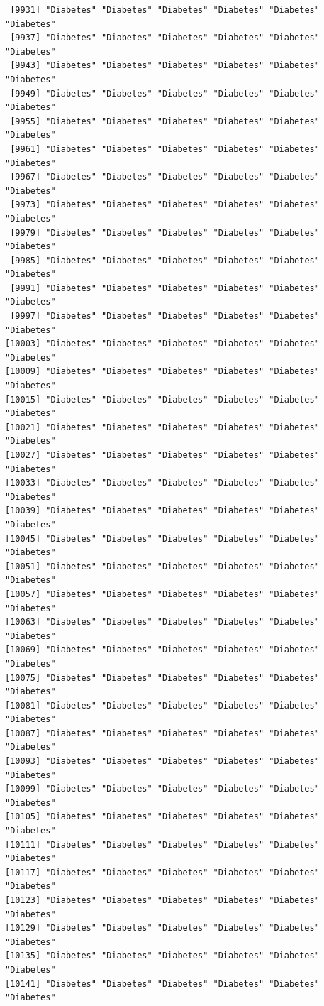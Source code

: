 \documentclass[
  letterpaper,
  DIV=11,
  numbers=noendperiod]{scrartcl}
\begin{document}
\begin{verbatim}
 [9931] "Diabetes" "Diabetes" "Diabetes" "Diabetes" "Diabetes" "Diabetes"
 [9937] "Diabetes" "Diabetes" "Diabetes" "Diabetes" "Diabetes" "Diabetes"
 [9943] "Diabetes" "Diabetes" "Diabetes" "Diabetes" "Diabetes" "Diabetes"
 [9949] "Diabetes" "Diabetes" "Diabetes" "Diabetes" "Diabetes" "Diabetes"
 [9955] "Diabetes" "Diabetes" "Diabetes" "Diabetes" "Diabetes" "Diabetes"
 [9961] "Diabetes" "Diabetes" "Diabetes" "Diabetes" "Diabetes" "Diabetes"
 [9967] "Diabetes" "Diabetes" "Diabetes" "Diabetes" "Diabetes" "Diabetes"
 [9973] "Diabetes" "Diabetes" "Diabetes" "Diabetes" "Diabetes" "Diabetes"
 [9979] "Diabetes" "Diabetes" "Diabetes" "Diabetes" "Diabetes" "Diabetes"
 [9985] "Diabetes" "Diabetes" "Diabetes" "Diabetes" "Diabetes" "Diabetes"
 [9991] "Diabetes" "Diabetes" "Diabetes" "Diabetes" "Diabetes" "Diabetes"
 [9997] "Diabetes" "Diabetes" "Diabetes" "Diabetes" "Diabetes" "Diabetes"
[10003] "Diabetes" "Diabetes" "Diabetes" "Diabetes" "Diabetes" "Diabetes"
[10009] "Diabetes" "Diabetes" "Diabetes" "Diabetes" "Diabetes" "Diabetes"
[10015] "Diabetes" "Diabetes" "Diabetes" "Diabetes" "Diabetes" "Diabetes"
[10021] "Diabetes" "Diabetes" "Diabetes" "Diabetes" "Diabetes" "Diabetes"
[10027] "Diabetes" "Diabetes" "Diabetes" "Diabetes" "Diabetes" "Diabetes"
[10033] "Diabetes" "Diabetes" "Diabetes" "Diabetes" "Diabetes" "Diabetes"
[10039] "Diabetes" "Diabetes" "Diabetes" "Diabetes" "Diabetes" "Diabetes"
[10045] "Diabetes" "Diabetes" "Diabetes" "Diabetes" "Diabetes" "Diabetes"
[10051] "Diabetes" "Diabetes" "Diabetes" "Diabetes" "Diabetes" "Diabetes"
[10057] "Diabetes" "Diabetes" "Diabetes" "Diabetes" "Diabetes" "Diabetes"
[10063] "Diabetes" "Diabetes" "Diabetes" "Diabetes" "Diabetes" "Diabetes"
[10069] "Diabetes" "Diabetes" "Diabetes" "Diabetes" "Diabetes" "Diabetes"
[10075] "Diabetes" "Diabetes" "Diabetes" "Diabetes" "Diabetes" "Diabetes"
[10081] "Diabetes" "Diabetes" "Diabetes" "Diabetes" "Diabetes" "Diabetes"
[10087] "Diabetes" "Diabetes" "Diabetes" "Diabetes" "Diabetes" "Diabetes"
[10093] "Diabetes" "Diabetes" "Diabetes" "Diabetes" "Diabetes" "Diabetes"
[10099] "Diabetes" "Diabetes" "Diabetes" "Diabetes" "Diabetes" "Diabetes"
[10105] "Diabetes" "Diabetes" "Diabetes" "Diabetes" "Diabetes" "Diabetes"
[10111] "Diabetes" "Diabetes" "Diabetes" "Diabetes" "Diabetes" "Diabetes"
[10117] "Diabetes" "Diabetes" "Diabetes" "Diabetes" "Diabetes" "Diabetes"
[10123] "Diabetes" "Diabetes" "Diabetes" "Diabetes" "Diabetes" "Diabetes"
[10129] "Diabetes" "Diabetes" "Diabetes" "Diabetes" "Diabetes" "Diabetes"
[10135] "Diabetes" "Diabetes" "Diabetes" "Diabetes" "Diabetes" "Diabetes"
[10141] "Diabetes" "Diabetes" "Diabetes" "Diabetes" "Diabetes" "Diabetes"

\end{verbatim}
\end{document}
